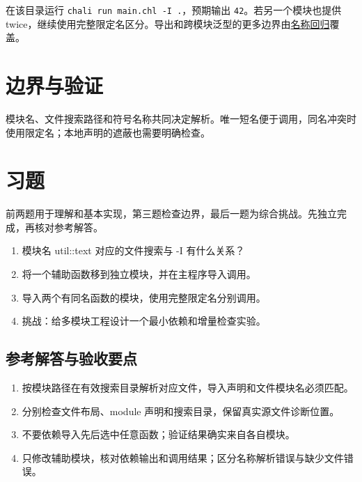 在该目录运行 \texttt{chali run main.\allowbreak{}chl -I .\allowbreak{}}，预期输出 \texttt{42}。若另一个模块也提供 twice，继续使用完整限定名区分。导出和跨模块泛型的更多边界由\href{https://gitee.com/rabbitc999/chali/blob/master/example/samples/import_names.chl}{名称回归}覆盖。

\section{边界与验证}

模块名、文件搜索路径和符号名称共同决定解析。唯一短名便于调用，同名冲突时使用限定名；本地声明的遮蔽也需要明确检查。

\section{习题}

前两题用于理解和基本实现，第三题检查边界，最后一题为综合挑战。先独立完成，再核对参考解答。

\begin{enumerate}

\item 模块名 util::text 对应的文件搜索与 -I 有什么关系？

\item 将一个辅助函数移到独立模块，并在主程序导入调用。

\item 导入两个有同名函数的模块，使用完整限定名分别调用。

\item 挑战：给多模块工程设计一个最小依赖和增量检查实验。

\end{enumerate}

\subsection*{参考解答与验收要点}

\begin{enumerate}

\item 按模块路径在有效搜索目录解析对应文件，导入声明和文件模块名必须匹配。

\item 分别检查文件布局、module 声明和搜索目录，保留真实源文件诊断位置。

\item 不要依赖导入先后选中任意函数；验证结果确实来自各自模块。

\item 只修改辅助模块，核对依赖输出和调用结果；区分名称解析错误与缺少文件错误。

\end{enumerate}

